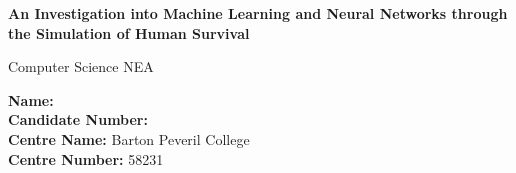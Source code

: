 \documentclass{article}
\begin{document}
\begin{titlepage}
    \begin{center}
        \vspace{1cm}
        \Huge
        
        \textbf{An Investigation into Machine Learning and Neural Networks through the Simulation of Human Survival}
        
        \vspace{1cm}
        \Large
        Computer Science NEA
        
        \vfill
        
        \large
        \textbf{Name:} \\
        \textbf{Candidate Number:} \\
        
        \textbf{Centre Name:} Barton Peveril College\\
        \textbf{Centre Number:} 58231\\
        \pagebreak
    \end{center}
\end{titlepage}

\large

\setcounter{tocdepth}{5}
\tableofcontents









%


\end{document}
